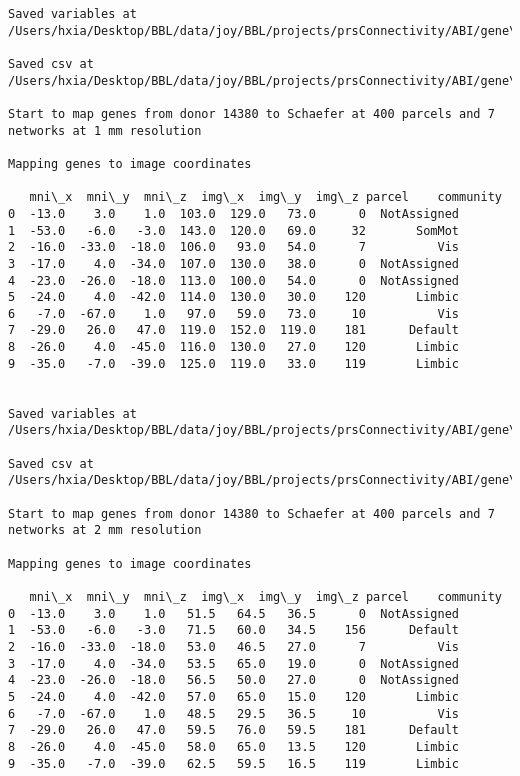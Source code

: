 \documentclass[11pt]{article}
\begin{document}
\begin{Verbatim}[commandchars=\\\{\}]
Saved variables at /Users/hxia/Desktop/BBL/data/joy/BBL/projects/prsConnectivity/ABI/gene\_mapping/14380donor\_200Parcels\_17Network\_2mm.pkl

Saved csv at /Users/hxia/Desktop/BBL/data/joy/BBL/projects/prsConnectivity/ABI/gene\_mapping/14380donor\_200Parcels\_17Network\_2mm.csv

Start to map genes from donor 14380 to Schaefer at 400 parcels and 7 networks at 1 mm resolution

Mapping genes to image coordinates

   mni\_x  mni\_y  mni\_z  img\_x  img\_y  img\_z parcel    community
0  -13.0    3.0    1.0  103.0  129.0   73.0      0  NotAssigned
1  -53.0   -6.0   -3.0  143.0  120.0   69.0     32       SomMot
2  -16.0  -33.0  -18.0  106.0   93.0   54.0      7          Vis
3  -17.0    4.0  -34.0  107.0  130.0   38.0      0  NotAssigned
4  -23.0  -26.0  -18.0  113.0  100.0   54.0      0  NotAssigned
5  -24.0    4.0  -42.0  114.0  130.0   30.0    120       Limbic
6   -7.0  -67.0    1.0   97.0   59.0   73.0     10          Vis
7  -29.0   26.0   47.0  119.0  152.0  119.0    181      Default
8  -26.0    4.0  -45.0  116.0  130.0   27.0    120       Limbic
9  -35.0   -7.0  -39.0  125.0  119.0   33.0    119       Limbic


Saved variables at /Users/hxia/Desktop/BBL/data/joy/BBL/projects/prsConnectivity/ABI/gene\_mapping/14380donor\_400Parcels\_7Network\_1mm.pkl

Saved csv at /Users/hxia/Desktop/BBL/data/joy/BBL/projects/prsConnectivity/ABI/gene\_mapping/14380donor\_400Parcels\_7Network\_1mm.csv

Start to map genes from donor 14380 to Schaefer at 400 parcels and 7 networks at 2 mm resolution

Mapping genes to image coordinates

   mni\_x  mni\_y  mni\_z  img\_x  img\_y  img\_z parcel    community
0  -13.0    3.0    1.0   51.5   64.5   36.5      0  NotAssigned
1  -53.0   -6.0   -3.0   71.5   60.0   34.5    156      Default
2  -16.0  -33.0  -18.0   53.0   46.5   27.0      7          Vis
3  -17.0    4.0  -34.0   53.5   65.0   19.0      0  NotAssigned
4  -23.0  -26.0  -18.0   56.5   50.0   27.0      0  NotAssigned
5  -24.0    4.0  -42.0   57.0   65.0   15.0    120       Limbic
6   -7.0  -67.0    1.0   48.5   29.5   36.5     10          Vis
7  -29.0   26.0   47.0   59.5   76.0   59.5    181      Default
8  -26.0    4.0  -45.0   58.0   65.0   13.5    120       Limbic
9  -35.0   -7.0  -39.0   62.5   59.5   16.5    119       Limbic



\end{Verbatim}
\end{document}

